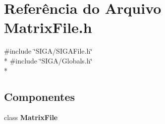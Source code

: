 \section{Referência do Arquivo Matrix\+File.\+h}
\label{_matrix_file_8h}
{\ttfamily \#include \char`\"{}S\+I\+G\+A/\+S\+I\+G\+A\+File.\+h\char`\"{}}\\*
{\ttfamily \#include \char`\"{}S\+I\+G\+A/\+Globals.\+h\char`\"{}}\\*
\subsection*{Componentes}
\begin{DoxyCompactItemize}
\item 
class {\bf Matrix\+File}
\end{DoxyCompactItemize}
